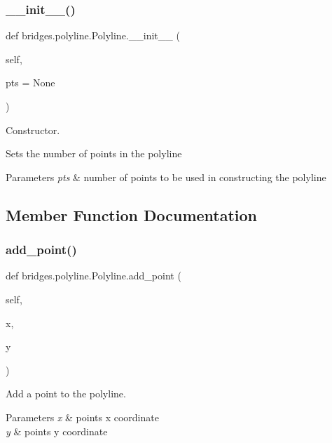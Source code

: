 \subsubsection{\texorpdfstring{\+\_\+\+\_\+init\+\_\+\+\_\+()}{\_\_init\_\_()}}
{\footnotesize\ttfamily def bridges.\+polyline.\+Polyline.\+\_\+\+\_\+init\+\_\+\+\_\+ (\begin{DoxyParamCaption}\item[{}]{self,  }\item[{}]{pts = {\ttfamily None} }\end{DoxyParamCaption})}



Constructor. 

Sets the number of points in the polyline


\begin{DoxyParams}{Parameters}
{\em pts} & number of points to be used in constructing the polyline \\
\hline
\end{DoxyParams}


\subsection{Member Function Documentation}
\mbox{\label{classbridges_1_1polyline_1_1_polyline_a0afbd2327d8dcba63809a6be07704753}} 
\subsubsection{\texorpdfstring{add\+\_\+point()}{add\_point()}}
{\footnotesize\ttfamily def bridges.\+polyline.\+Polyline.\+add\+\_\+point (\begin{DoxyParamCaption}\item[{}]{self,  }\item[{}]{x,  }\item[{}]{y }\end{DoxyParamCaption})}



Add a point to the polyline. 


\begin{DoxyParams}{Parameters}
{\em x} & point\textquotesingle{}s x coordinate \\
\hline
{\em y} & point\textquotesingle{}s y coordinate \\
\hline
\end{DoxyParams}
\mbox{\label{classbridges_1_1polyline_1_1_polyline_a7f99e9e20c90068713b54ad64df3f193}} 
